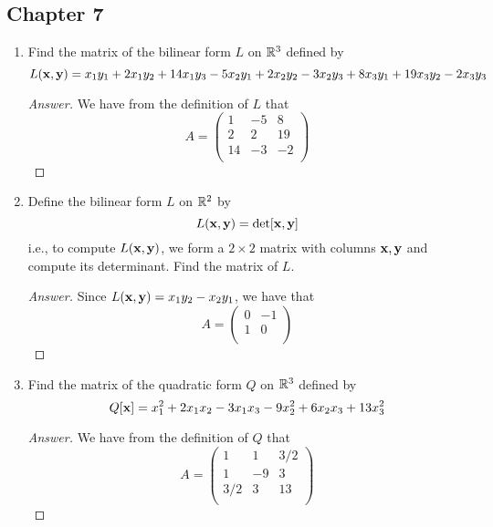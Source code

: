 \documentclass[../psets.tex]{subfiles}
\begin{document}
\subsection*{Chapter 7}
\begin{enumerate}[label={\textbf{1.\arabic*.}}]
    \item Find the matrix of the bilinear form $L$ on $\mathbb{R}^3$ defined by
    \begin{equation*}
        L(\mathbf{x},\mathbf{y}) = x_1y_1+2x_1y_2+14x_1y_3-5x_2y_1+2x_2y_2-3x_2y_3+8x_3y_1+19x_3y_2-2x_3y_3
    \end{equation*}
    \begin{proof}[Answer]
        We have from the definition of $L$ that
        \begin{equation*}
            A =
            \begin{pmatrix}
                1 & -5 & 8\\
                2 & 2 & 19\\
                14 & -3 & -2\\
            \end{pmatrix}
        \end{equation*}
    \end{proof}
    \item Define the bilinear form $L$ on $\mathbb{R}^2$ by
    \begin{equation*}
        L(\mathbf{x},\mathbf{y}) = \det[\mathbf{x},\mathbf{y}]
    \end{equation*}
    i.e., to compute $L(\mathbf{x},\mathbf{y})$, we form a $2\times 2$ matrix with columns $\mathbf{x},\mathbf{y}$ and compute its determinant. Find the matrix of $L$.
    \begin{proof}[Answer]
        Since $L(\mathbf{x},\mathbf{y})=x_1y_2-x_2y_1$, we have that
        \begin{equation*}
            A =
            \begin{pmatrix}
                0 & -1\\
                1 & 0\\
            \end{pmatrix}
        \end{equation*}
    \end{proof}
    \item Find the matrix of the quadratic form $Q$ on $\mathbb{R}^3$ defined by
    \begin{equation*}
        Q[\mathbf{x}] = x_1^2+2x_1x_2-3x_1x_3-9x_2^2+6x_2x_3+13x_3^2
    \end{equation*}
    \begin{proof}[Answer]
        We have from the definition of $Q$ that
        \begin{equation*}
            A =
            \begin{pmatrix}
                1 & 1 & 3/2\\
                1 & -9 & 3\\
                3/2 & 3 & 13\\
            \end{pmatrix}
        \end{equation*}
    \end{proof}
\end{enumerate}
\end{document}
